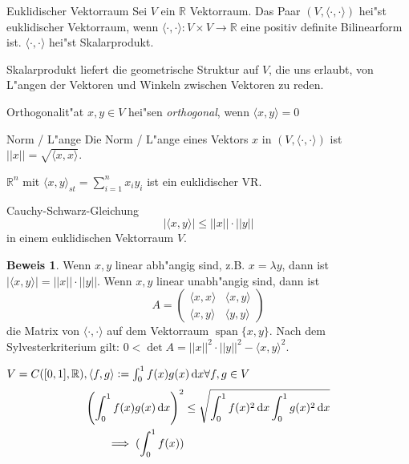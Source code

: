 \documentclass[oneside,fontsize=11pt,paper=a4,BCOR=0mm,DIV=12,automark,headsepline]{scrbook}
\DeclareMathOperator{\spn}{span}
\theoremstyle{remark}
\theoremstyle{definition}
\theoremstyle{definition}
\newtheorem*{prof}{Beweis}
\theoremstyle{remark}
\begin{document}
\begin{definition}{Euklidischer Vektorraum}{}
	Sei $V$ ein $\mathbb{R}$ Vektorraum. Das Paar $(V, \langle\cdot,\cdot\rangle)$ hei"st
	euklidischer Vektorraum, wenn $\langle\cdot,\cdot\rangle: V\times V \rightarrow \mathbb{R}$
	eine positiv definite Bilinearform ist. $\langle\cdot,\cdot\rangle$ hei"st Skalarprodukt.  
\end{definition}
Skalarprodukt liefert die geometrische Struktur auf $V$, die uns erlaubt, von L"angen der Vektoren und Winkeln zwischen Vektoren zu reden.
\begin{definition}{Orthogonalit"at}{}
  $x,y\in V$ hei"sen \emph{orthogonal}, wenn $\langle x,y\rangle=0$
\end{definition}
\begin{definition}{Norm / L"ange}{}
  Die Norm / L"ange eines Vektors \(x\) in \((V, \langle\cdot , \cdot\rangle)\) ist \(||x|| = \sqrt{\langle x,x\rangle}\).
\end{definition}
\begin{exa}
  \(\mathbb{R}^n\) mit \(\langle x, y\rangle_{st} = \sum_{i=1}^nx_iy_i\) ist ein euklidischer VR.
\end{exa}
\begin{satz}{Cauchy-Schwarz-Gleichung}{}
  \[|\langle x,y \rangle |\leq ||x||\cdot ||y||\] in einem euklidischen Vektorraum \(V\).
\end{satz}
\begin{prof}
  Wenn \(x, y\) linear abh"angig sind, z.B. \(x = \lambda y\), dann ist \(|\langle x, y\rangle | = ||x||\cdot ||y||\). Wenn \(x, y\) linear unabh"angig sind, dann ist \[A =
    \begin{pmatrix}
      \langle x, x\rangle & \langle x, y\rangle \\
      \langle x, y\rangle & \langle y, y\rangle
    \end{pmatrix}
\] die Matrix von \(\langle\cdot , \cdot\rangle\) auf dem Vektorraum \(\spn\{x, y\}\). Nach dem Sylvesterkriterium gilt: \(0 < \det A = ||x||^2\cdot ||y||^2 - \langle x, y\rangle ^2\).
\end{prof}
\begin{exa}
  \(V = C([0, 1], \mathbb{R}), \langle f, g\rangle := \int_0^1f(x)g(x)\dif x \forall f, g \in V\)
  \begin{align*}
    \left(\int_0^1f(x)g(x)\dif x\right)^2 &\leq \sqrt{\int_0^1 f(x)^2\dif x\int_0^1 g(x)^2\dif x} \\
    \implies (\int_0^1 f(x))
  \end{align*}
\end{exa}
\end{document}
